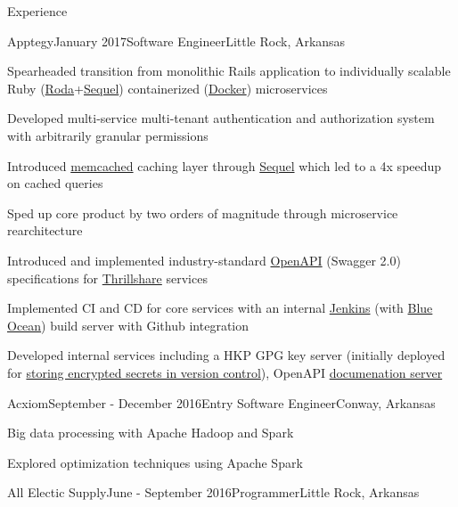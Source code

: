 \documentclass{resume} %
\begin{document}
\begin{rSection}{Experience}

\begin{rSubsection}{Apptegy}{January 2017}{Software Engineer}{Little Rock, Arkansas}

	\item Spearheaded transition from monolithic Rails application to individually scalable Ruby (\href{http://roda.jeremyevans.net/}{Roda}+\href{http://sequel.jeremyevans.net/}{Sequel}) containerized (\href{https://www.docker.com/}{Docker}) microservices
	\item Developed multi-service multi-tenant authentication and authorization system with arbitrarily granular permissions
	\item Introduced \href{https://memcached.org/}{memcached} caching layer through \href{http://sequel.jeremyevans.net/rdoc-plugins/classes/Sequel/Plugins/Caching.html}{Sequel} which led to a 4x speedup on cached queries
	\item Sped up core product by two orders of magnitude through microservice rearchitecture
	\item Introduced and implemented industry-standard \href{https://www.openapis.org/}{OpenAPI} (Swagger 2.0) specifications for \href{http://apptegy.com/thrillshare}{Thrillshare} services
	\item Implemented CI and CD for core services with an internal \href{https://jenkins.io/}{Jenkins} (with \href{https://jenkins.io/projects/blueocean/}{Blue Ocean}) build server with Github integration
	\item Developed internal services including a HKP GPG key server (initially deployed for \href{https://github.com/AGWA/git-crypt}{storing encrypted secrets in version control}), OpenAPI \href{https://github.com/Rebilly/ReDoc}{documenation server}
\end{rSubsection}

\begin{rSubsection}{Acxiom}{September - December 2016}{Entry Software Engineer}{Conway, Arkansas}

	\item Big data processing with Apache Hadoop and Spark
	\item Explored optimization techniques using Apache Spark
\end{rSubsection}


\begin{rSubsection}{All Electic Supply}{June - September 2016}{Programmer}{Little Rock, Arkansas}


\end{rSubsection}
\end{rSection}
\end{document}

